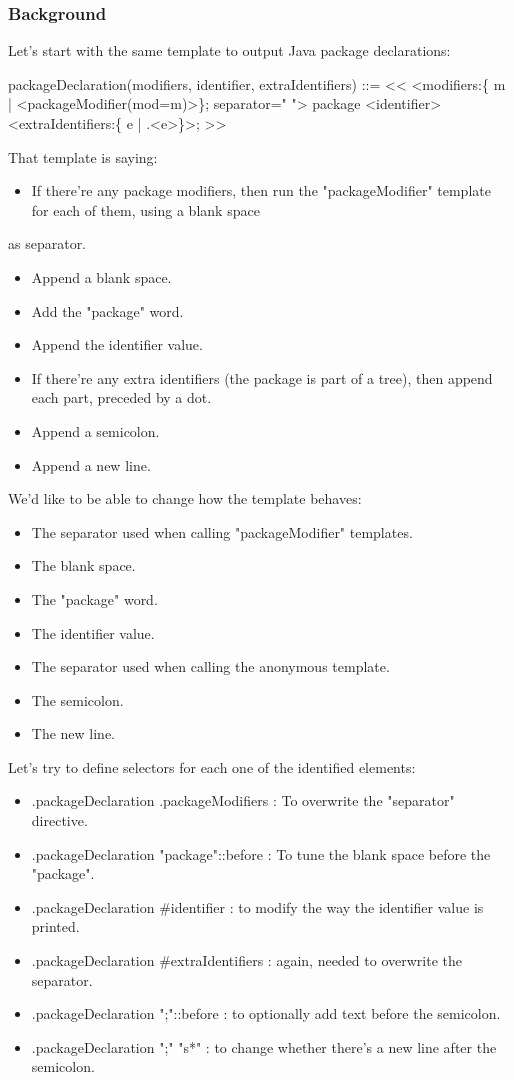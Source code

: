 \documentclass[11pt]{article}
\begin{document}
\subsubsection{Background}
\label{sec-1-4-1}

Let's start with the same template to output Java package declarations:

packageDeclaration(modifiers, identifier, extraIdentifiers) ::= <<
<modifiers:\{ m | <packageModifier(mod=m)>\}; separator=" "> package <identifier><extraIdentifiers:\{ e | .<e>\}>;
>>

That template is saying:
\begin{itemize}
\item If there're any package modifiers, then run the "packageModifier" template for each of them, using a blank space
\end{itemize}
as separator.
\begin{itemize}
\item Append a blank space.
\item Add the "package" word.
\item Append the identifier value.
\item If there're any extra identifiers (the package is part of a tree), then append each part, preceded by a dot.
\item Append a semicolon.
\item Append a new line.
\end{itemize}

We'd like to be able to change how the template behaves:
\begin{itemize}
\item The separator used when calling "packageModifier" templates.
\item The blank space.
\item The "package" word.
\item The identifier value.
\item The separator used when calling the anonymous template.
\item The semicolon.
\item The new line.
\end{itemize}

Let's try to define selectors for each one of the identified elements:
\begin{itemize}
\item .packageDeclaration .packageModifiers : To overwrite the "separator" directive.
\item .packageDeclaration "package"::before : To tune the blank space before the "package".
\item .packageDeclaration \#identifier : to modify the way the identifier value is printed.
\item .packageDeclaration \#extraIdentifiers : again, needed to overwrite the separator.
\item .packageDeclaration ";"::before : to optionally add text before the semicolon.
\item .packageDeclaration ";" "s*" : to change whether there's a new line after the semicolon.
\end{itemize}
\end{document}
